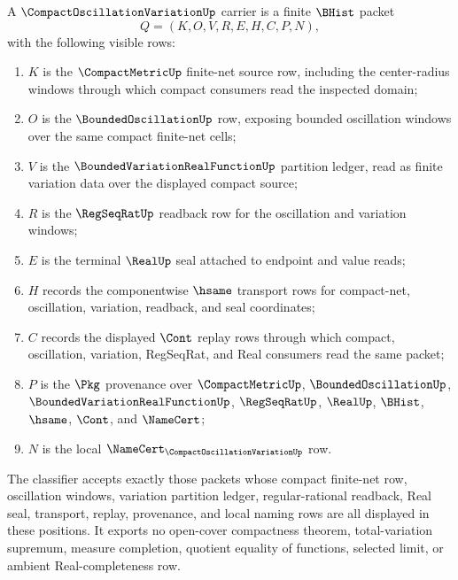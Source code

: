 \begin{definition}
\label{def:compact-oscillation-variation-carrier}
A $\CompactOscillationVariationUp$ carrier is a finite $\BHist$ packet
$$
Q=(K,O,V,R,E,H,C,P,N),
$$
with the following visible rows:
\begin{enumerate}
\item $K$ is the $\CompactMetricUp$ finite-net source row, including the center-radius windows through which compact consumers read the inspected domain;
\item $O$ is the $\BoundedOscillationUp$ row, exposing bounded oscillation windows over the same compact finite-net cells;
\item $V$ is the $\BoundedVariationRealFunctionUp$ partition ledger, read as finite variation data over the displayed compact source;
\item $R$ is the $\RegSeqRatUp$ readback row for the oscillation and variation windows;
\item $E$ is the terminal $\RealUp$ seal attached to endpoint and value reads;
\item $H$ records the componentwise $\hsame$ transport rows for compact-net, oscillation, variation, readback, and seal coordinates;
\item $C$ records the displayed $\Cont$ replay rows through which compact, oscillation, variation, RegSeqRat, and Real consumers read the same packet;
\item $P$ is the $\Pkg$ provenance over $\CompactMetricUp$, $\BoundedOscillationUp$, $\BoundedVariationRealFunctionUp$, $\RegSeqRatUp$, $\RealUp$, $\BHist$, $\hsame$, $\Cont$, and $\NameCert$;
\item $N$ is the local $\NameCert_{\CompactOscillationVariationUp}$ row.
\end{enumerate}
The classifier accepts exactly those packets whose compact finite-net row, oscillation windows, variation partition ledger, regular-rational readback, Real seal, transport, replay, provenance, and local naming rows are all displayed in these positions. It exports no open-cover compactness theorem, total-variation supremum, measure completion, quotient equality of functions, selected limit, or ambient Real-completeness row.
\end{definition}


